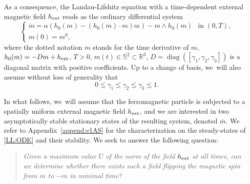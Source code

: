 \documentclass[JEP,XML,SOM,Unicode,NoEqCountersInSection,NoFloatCountersInSection,published]{cedram}
\theoremstyle{definition}
\newcommand{\R} {\mathbb{R}}
\begin{document}
As a consequence, the Landau-Lifshitz equation with a time-dependent external magnetic field $h_{\rm ext}$ reads as the ordinary differential system
\begin{equation}\label{LL:ODE}
\begin{cases}
\dot{m} = \alpha \left(h_0(m)-(h_0(m)\cdot m) m\right)-m\wedge h_0(m) & \text{in }(0,T), \\
m(0) =m^0,
\end{cases}
\end{equation}
where the dotted notation $\dot{m}$ stands for the time derivative of $m$, $h_0(m)=-Dm+h_{\rm ext}$, $T>0$, $m(t)\in\mathbb{S}^2\subset\R^3$, $D=\operatorname{diag}([\gamma_1,\gamma_2,\gamma_3])$ is a diagonal matrix with positive coefficients.
Up to a change of basis, we~will also assume without loss of generality that
\begin{equation}\label{hyp:alpha}
0\leq \gamma_1\leq \gamma_2\leq\gamma_3\leq 1.
\end{equation}

In what follows, we~will assume that the ferromagnetic particle is subjected to a spatially uniform external magnetic field $h_{\rm ext}$, and we are interested in two asymptotically stable stationary states of the resulting system, denoted $\overline{m}$. {We refer to Appendix~\ref{append:e1AS} for the characterization on the steady-states of \eqref{LL:ODE} and their stability.}
We seek to answer the following question:
\begin{quote}
\textit{Given a maximum value $U $ of the norm of the field $h_{\rm ext}$ at all times, can we determine whether there exists such a field flipping the magnetic spin from $\overline{m}$ to $-\overline{m}$ in minimal time?}
\end{quote}
\end{document}
